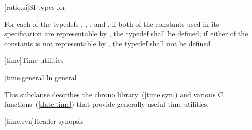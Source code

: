 [ratio.si]{SI types for }

\pnum
For each of the typedefs , , , and ,
if both of the constants used in its specification are representable by
, the typedef shall be defined; if either of the constants is not
representable by , the typedef shall not be defined.

[time]{Time utilities}

[time.general]{In general}

\pnum
{}%
This subclause describes the chrono library~(\ref{time.syn}) and various C
functions~(\ref{date.time}) that provide generally useful time
utilities.

[time.syn]{Header  synopsis}

